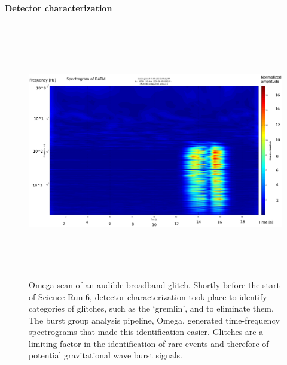 

                \paragraph{Detector characterization}
                \label{detchar}
            

\begin{figure}
\begin{center}
\includegraphics[height=111mm, width=148mm]{aglitch928228390_new.eps} 
\caption{Omega scan of an audible broadband glitch. Shortly before the start of Science Run 6, detector characterization took place to identify categories of glitches, such as the `gremlin', and to eliminate them. The burst group analysis pipeline, Omega, generated time-frequency spectrograms that made this identification easier. Glitches are a limiting factor in the identification of rare events and therefore of potential gravitational wave burst signals.}
\label{omega_scan_audible_glitch}
\end{center}
\end{figure}


